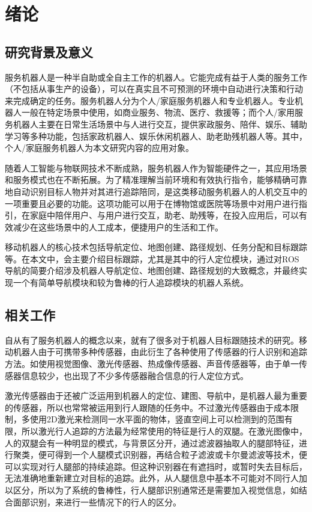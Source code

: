
\chapter{绪论}

\section{研究背景及意义}

  服务机器人是一种半自助或全自主工作的机器人。它能完成有益于人类的服务工作（不包括从事生产的设备），可以在真实且不可预测的环境中自动进行决策和行动来完成确定的任务。服务机器人分为个人/家庭服务机器人和专业机器人。专业机器人一般在特定场景中使用，如商业服务、物流、医疗、救援等；而个人/家用服务机器人主要在日常生活场景中与人进行交互，提供家政服务、陪伴、娱乐、辅助学习等多种功能，包括家政机器人、娱乐休闲机器人、助老助残机器人等。其中，个人/家庭服务机器人为本文研究内容的应用对象。

  随着人工智能与物联网技术不断成熟，服务机器人作为智能硬件之一，其应用场景和服务模式也在不断拓展。为了精准理解当前环境和有效执行指令，能够精确可靠地自动识别目标人物并对其进行追踪陪同，是这类移动服务机器人的人机交互中的一项重要且必要的功能。这项功能可以用于在博物馆或医院等场景中对用户进行指引，在家庭中陪伴用户、与用户进行交互，助老、助残等，在投入应用后，可以有效减少在这些场景中的人工成本，便捷用户的生活和工作。

  移动机器人的核心技术包括导航定位、地图创建、路径规划、任务分配和目标跟踪等。在本文中，会主要介绍目标跟踪，尤其是其中的行人定位模块，通过对ROS导航的简要介绍涉及机器人导航定位、地图创建、路径规划的大致概念，并最终实现一个有简单导航模块和较为鲁棒的行人追踪模块的机器人系统。

\section{相关工作}

  自从有了服务机器人的概念以来，就有了很多对于机器人目标跟随技术的研究。移动机器人由于可携带多种传感器，由此衍生了各种使用了传感器的行人识别和追踪方法。如使用视觉图像、激光传感器、热成像传感器\cite{treptow2006real}、声音传感器\cite{zhou2008target}等，由于单一传感器信息较少，也出现了不少多传感器融合信息的行人定位方式\cite{susperregi2013rgb}。

  激光传感器由于还被广泛运用到机器人的定位、建图、导航中，是机器人最为重要的传感器，所以也常常被运用到行人跟随的任务中。不过激光传感器由于成本限制，多使用2D激光来检测同一水平面的物体，竖直空间上可以检测到的范围有限，所以激光行人追踪的方法最为经常使用的特征是行人的双腿\cite{arras2008efficient}。在激光图像中，人的双腿会有一种明显的模式，与背景区分开，通过滤波器抽取人的腿部特征，进行聚类，便可得到一个人腿模式识别器，再结合粒子滤波或卡尔曼滤波等技术，便可以实现对行人腿部的持续追踪。但这种识别器在有遮挡时，或暂时失去目标后，无法准确地重新建立对目标的追踪。此外，从人腿信息中基本不可能对不同行人加以区分，所以为了系统的鲁棒性，行人腿部识别通常还是需要加入视觉信息，如结合面部识别，来进行一些情况下的行人的区分\cite{kleinehagenbrock2002person,bellotto2008multisensor}。

